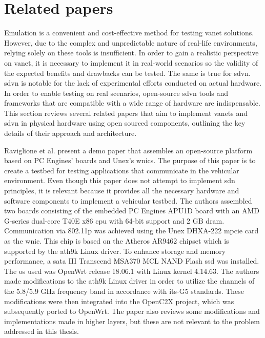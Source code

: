\chapter{Related papers}
\label{cha:related_papers}


    Emulation is a convenient and cost-effective method for testing \gls{vanet} solutions. However, due to the complex and unpredictable nature of real-life environments, relying solely on these tools is insufficient\cite{cardona_software-defined_2020}. In order to gain a realistic perspective on \gls{vanet}, it is necessary to implement it in real-world scenarios so the validity of the expected benefits and drawbacks can be tested. The same is true for \gls{sdvn}. 
    \gls{sdvn} is notable for the lack of experimental efforts conducted on actual hardware. In order to enable testing on real scenarios, open-source \gls{sdvn} tools and frameworks that are compatible with a wide range of hardware are indispensable\cite{cardona_software-defined_2020}. This section reviews several related papers that aim to implement \glspl{vanet} and \gls{sdvn} in physical hardware using open sourced components, outlining the key details of their approach and architecture. 

     
    Raviglione et al.\cite{raviglione_open_2019} present a demo paper that assembles an open-source platform based on PC Engines' boards and Unex's \glspl{wnic}. The purpose of this paper is to create a testbed for testing applications that communicate in the vehicular environment. Even though this paper does not attempt to implement \gls{sdn} principles, it is relevant because it provides all the necessary hardware and software components to implement a vehicular testbed.
    The authors assembled two boards consisting of the embedded PC Engines APU1D board with an AMD G-series dual-core T40E x86 \gls{cpu} with 64-bit support and 2 GB \gls{dram}. Communication via 802.11p was achieved using the Unex DHXA-222 \gls{mpcie} card as the \gls{wnic}. This chip is based on the Atheros AR9462 chipset which is supported by the ath9k Linux driver. To enhance storage and memory performance, a \gls{sata} III Transcend MSA370 MCL NAND Flash \gls{ssd} was installed.
    The \gls{os} used was OpenWrt release 18.06.1 with Linux kernel 4.14.63. The authors made modifications to the ath9k Linux driver in order to utilize the channels of the 5.8/5.9 GHz frequency band in accordance with \gls{its}-G5 standards. These modifications were then integrated into the OpenC2X project, which was subsequently ported to OpenWrt. The paper also reviews some modifications and implementations made in higher layers, but these are not relevant to the problem addressed in this thesis.
    
